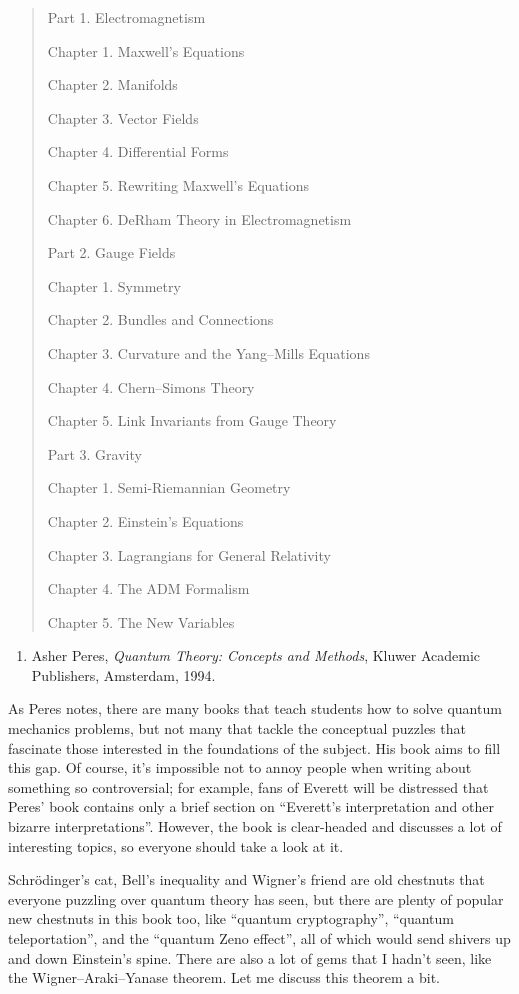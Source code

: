 \documentclass[12pt]{article}
\def\tightlist{}
\begin{document}
\begin{quote}
{\rm
Part 1. Electromagnetism

Chapter 1. Maxwell's Equations

Chapter 2. Manifolds

Chapter 3. Vector Fields

Chapter 4. Differential Forms

Chapter 5. Rewriting Maxwell's Equations

Chapter 6. DeRham Theory in Electromagnetism

Part 2. Gauge Fields

Chapter 1. Symmetry

Chapter 2. Bundles and Connections

Chapter 3. Curvature and the Yang--Mills Equations

Chapter 4. Chern--Simons Theory

Chapter 5. Link Invariants from Gauge Theory

Part 3. Gravity

Chapter 1. Semi-Riemannian Geometry

Chapter 2. Einstein's Equations

Chapter 3. Lagrangians for General Relativity

Chapter 4. The ADM Formalism

Chapter 5. The New Variables
}
\end{quote}

\begin{enumerate}
\def\labelenumi{\arabic{enumi})}
\setcounter{enumi}{1}
\tightlist
\item
  Asher Peres, \emph{Quantum Theory: Concepts and Methods}, Kluwer
  Academic Publishers, Amsterdam, 1994.
\end{enumerate}
\noindent
As Peres notes, there are many books that teach students how to solve
quantum mechanics problems, but not many that tackle the conceptual
puzzles that fascinate those interested in the foundations of the
subject. His book aims to fill this gap. Of course, it's impossible not
to annoy people when writing about something so controversial; for
example, fans of Everett will be distressed that Peres' book contains
only a brief section on ``Everett's interpretation and other bizarre
interpretations''. However, the book is clear-headed and discusses a lot
of interesting topics, so everyone should take a look at it.

Schr\"odinger's cat, Bell's inequality and Wigner's friend are old
chestnuts that everyone puzzling over quantum theory has seen, but there
are plenty of popular new chestnuts in this book too, like ``quantum
cryptography'', ``quantum teleportation'', and the ``quantum Zeno
effect'', all of which would send shivers up and down Einstein's spine.
There are also a lot of gems that I hadn't seen, like the
Wigner--Araki--Yanase theorem. Let me discuss this theorem a bit.
\end{document}
